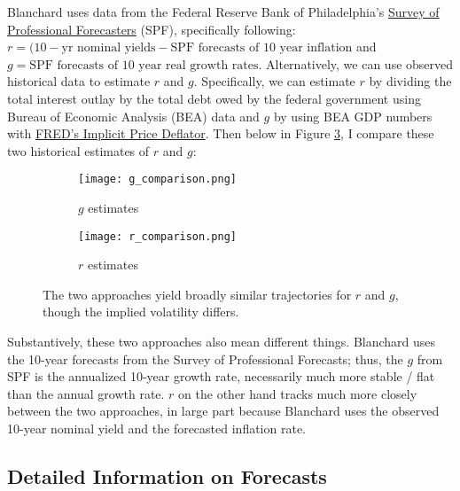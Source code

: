 \documentclass{article}
\begin{document}
Blanchard uses data from the Federal Reserve Bank of Philadelphia's \href{https://www.philadelphiafed.org/surveys-and-data/real-time-data-research/survey-of-professional-forecasters}{Survey of Professional Forecasters} (SPF), specifically following: $r = (10-\text{yr nominal yields} - \text{SPF forecasts of 10 year inflation}$ and $g = \text{SPF forecasts of 10 year real growth rates}$. Alternatively, we can use observed historical data to estimate $r$ and $g$. Specifically, we can estimate $r$ by dividing the total interest outlay by the total debt owed by the federal government using Bureau of Economic Analysis (BEA) data and $g$ by using BEA GDP numbers with \href{https://fred.stlouisfed.org/series/GDPDEF}{FRED's Implicit Price Deflator}. Then below in Figure \ref{fig:r_g_comparison}, I compare these two historical estimates of $r$ and $g$:
\begin{figure}[htbp]               %
  \centering                       %
  \begin{subfigure}{0.48\textwidth}%
    \centering
    \texttt{[image: g\_comparison.png]}
    \caption{$g$ estimates}        %
    \label{subfig:g_comparison}
  \end{subfigure}
  \hfill                             %
  \begin{subfigure}{0.48\textwidth}
    \centering
    \texttt{[image: r\_comparison.png]}
    \caption{$r$ estimates}
    \label{subfig:r_comparison}
  \end{subfigure}
  \caption{The two approaches yield broadly similar trajectories for
           $r$ and $g$, though the implied volatility differs.}
  \label{fig:r_g_comparison}
\end{figure}

Substantively, these two approaches also mean different things. Blanchard uses the 10-year forecasts from the Survey of Professional Forecasts; thus, the $g$ from SPF is the annualized 10-year growth rate, necessarily much more stable / flat than the annual growth rate. $r$ on the other hand tracks much more closely between the two approaches, in large part because Blanchard uses the observed 10-year nominal yield and the forecasted inflation rate. 

\subsection{Detailed Information on Forecasts}
\end{document}
